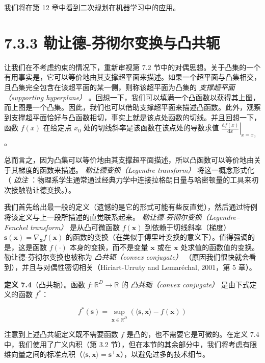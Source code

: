 我们将在第 12 章中看到二次规划在机器学习中的应用。

\section*{7.3.3 勒让德-芬彻尔变换与凸共轭}

让我们在不考虑约束的情况下，重新审视第 7.2 节中的对偶思想。关于凸集的一个有用事实是，它可以等价地由其支撑超平面来描述。如果一个超平面与凸集相交，且凸集完全包含在该超平面的某一侧，则称该超平面为凸集的 \emph{支撑超平面（supporting hyperplane）} 。回想一下，我们可以填满一个凸函数以获得其上图，而上图是一个凸集。因此，我们也可以借助支撑超平面来描述凸函数。此外，观察到支撑超平面恰好与凸函数相切，事实上就是该点处函数的切线。并且回想一下，函数 $ f(x) $ 在给定点 $ x_0 $ 处的切线斜率是该函数在该点处的导数求值 $ \left.\frac{\mathrm{d}f(x)}{\mathrm{d}x}\right|_{x=x_0} $。

总而言之，因为凸集可以等价地由其支撑超平面描述，所以凸函数可以等价地由关于其梯度的函数来描述。 \emph{勒让德变换（Legendre transform）} 将这一概念形式化（ \emph{边注} ：物理系学生通常通过经典力学中连接拉格朗日量与哈密顿量的工具来初次接触勒让德变换。）。

我们首先给出最一般的定义（遗憾的是它的形式可能有些反直觉），然后通过特例将该定义与上一段所描述的直觉联系起来。 \emph{勒让德-芬彻尔变换（Legendre–Fenchel transform）} 是从凸可微函数 $ f(\boldsymbol{x}) $ 到依赖于切线斜率（梯度）$ \boldsymbol{s}(\boldsymbol{x}) = \nabla_{\boldsymbol{x}} f(\boldsymbol{x}) $ 的函数的变换（在类似于傅里叶变换的意义下）。值得强调的是，这是函数 $ f(\cdot) $ 本身的变换，而不是变量 $ \boldsymbol{x} $ 或在 $ \boldsymbol{x} $ 处求值的函数值的变换。勒让德-芬彻尔变换也被称为 \emph{凸共轭（convex conjugate）} （原因我们很快就会看到），并且与对偶性密切相关（Hiriart-Urruty and Lemaréchal, 2001，第 5 章）。

\textbf{定义 7.4}（凸共轭）。函数 $ f : \mathbb{R}^D \to \mathbb{R} $ 的 \emph{凸共轭（convex conjugate）} 是由下式定义的函数 $ f^* $：

\begin{equation}
f^*(\boldsymbol{s}) = \sup_{\boldsymbol{x} \in \mathbb{R}^D} \left( \langle \boldsymbol{s}, \boldsymbol{x} \rangle - f(\boldsymbol{x}) \right)
\tag{7.53}\label{eq:7-53}
\end{equation}

注意到上述凸共轭定义既不需要函数 $ f $ 是凸的，也不需要它是可微的。在定义 7.4 中，我们使用了广义内积（第 3.2 节），但在本节的其余部分中，我们将考虑有限维向量之间的标准点积（$ \langle \boldsymbol{s}, \boldsymbol{x} \rangle = \boldsymbol{s}^\top \boldsymbol{x} $），以避免过多的技术细节。

